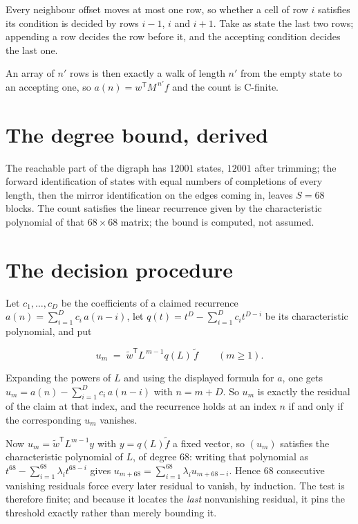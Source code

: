 \documentclass[11pt]{article}
\theoremstyle{definition}
\begin{document}
Every neighbour offset moves at most one row, so whether a cell of row $i$ satisfies its condition is decided by rows $i-1$, $i$ and $i+1$. Take as state the last two rows; appending a row decides the row before it, and the accepting condition decides the last one.

An array of $n'$ rows is then exactly a walk of length $n'$ from the empty state to an accepting one, so $a(n) = w^{\mathsf T}M^{\,n'}f$ and the count is C-finite.

\section{The degree bound, derived}

The reachable part of the digraph has $12001$ states, $12001$ after trimming; the forward identification of states with equal numbers of completions of every length, then the mirror identification on the edges coming in, leaves $S = 68$ blocks. The count satisfies the linear recurrence given by the characteristic polynomial of that $68\times68$ matrix; the bound is computed, not assumed.

\section{The decision procedure}

Let $c_1,\dots,c_D$ be the coefficients of a claimed recurrence $a(n) = \sum_{i=1}^{D} c_i\,a(n-i)$, let $q(t) = t^{D} - \sum_{i=1}^{D} c_i t^{D-i}$ be its characteristic polynomial, and put

\[u_m \;=\; \tilde w^{\mathsf T} L^{\,m-1} q(L)\,\tilde f \qquad (m \ge 1).\]

Expanding the powers of $L$ and using the displayed formula for $a$, one gets $u_m = a(n) - \sum_{i=1}^{D} c_i\,a(n-i)$ with $n = m + D$. So $u_m$ is exactly the residual of the claim at that index, and the recurrence holds at an index $n$ if and only if the corresponding $u_m$ vanishes.

Now $u_m = \tilde w^{\mathsf T} L^{m-1} y$ with $y = q(L)\tilde f$ a fixed vector, so $(u_m)$ satisfies the characteristic polynomial of $L$, of degree $68$: writing that polynomial as $t^{68} - \sum_{i=1}^{68} \lambda_i t^{68-i}$ gives $u_{m+68} = \sum_{i=1}^{68} \lambda_i u_{m+68-i}$. Hence $68$ consecutive vanishing residuals force every later residual to vanish, by induction. The test is therefore finite; and because it locates the {\itshape last} nonvanishing residual, it pins the threshold exactly rather than merely bounding it.
\end{document}
